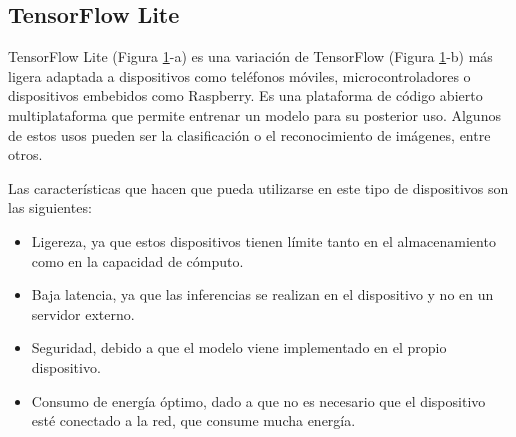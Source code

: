 \subsection{TensorFlow Lite}
\label{sec:tensor}
TensorFlow Lite (Figura \ref{fig:tf}-a) es una variación de TensorFlow (Figura \ref{fig:tf}-b) más ligera adaptada a dispositivos como teléfonos móviles, microcontroladores o dispositivos embebidos como Raspberry. Es una plataforma de código abierto multiplataforma que permite entrenar un modelo para su posterior uso. Algunos de estos usos pueden ser la clasificación o el reconocimiento de imágenes, entre otros.\\
\begin{figure}[h!]
  \begin{center}
    \hspace{2mm}
  \end{center}
\caption{} \label{fig:tf}
\end{figure}

Las características que hacen que pueda utilizarse en este tipo de dispositivos son las siguientes:
\begin{itemize}
\item{Ligereza}, ya que estos dispositivos tienen límite tanto en el almacenamiento como en la capacidad de cómputo.
\item{Baja latencia}, ya que las inferencias se realizan en el dispositivo y no en un servidor externo. 
\item{Seguridad}, debido a que el modelo viene implementado en el propio dispositivo.
\item{Consumo de energía óptimo,} dado a que no es necesario que el dispositivo esté conectado a la red, que consume mucha energía.
\end{itemize}

